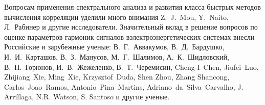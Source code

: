 Вопросам применения спектрального анализа и развития класса быстрых методов вычисления корреляции уделили много внимания Z.~J.~Mou, Y.~Naito, Л.~Рабинер и другие исследователи.
Значительный вклад в решение вопросов по оценке параметров гармоник сигналов вэлектроэнергетических системах внесли Российские и зарубежные ученые:
В.~Г.~Аввакумов, В.~Д.~Бардушко, И.~И.~Карташов, В.~З.~Манусов, М.~Г.~Шалимов, А.~К.~Шидловский, В.~Н.~Горюнов, И.~В.~Жежеленко, В.~Т.~Черемисин, Cheng-I~Chen, Jiufei~Luo, Zhijiang~Xie, Ming~Xie, Krzysztof~Duda, Shen Zhou, Zhang Shancong,
Carlos~Joao~Ramos, Antonio~Pina~Martins, Adriano~da~Silva~Carvalho, J. Arrillaga, N.R. Watson, S. Santoso и другие ученые.
%
%




